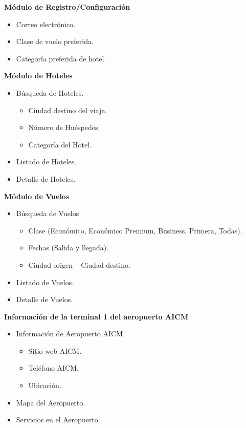 \textbf{Módulo de Registro/Configuración}

\begin{itemize}
	\item Correo electrónico.
	\item Clase de vuelo preferida.
	\item Categoría preferida de hotel. 
\end{itemize}

\textbf{Módulo de Hoteles}

\begin{itemize}
	\item Búsqueda de Hoteles.
	\begin{itemize}
		\item Ciudad destino del viaje.
		\item Número de Huéspedes.
		\item Categoría del Hotel.
	\end{itemize}
	\item Listado de Hoteles.
	\item Detalle de Hoteles.
\end{itemize}

\textbf{Módulo de Vuelos}
 
\begin{itemize}
	\item Búsqueda de Vuelos
	\begin{itemize}
		\item Clase (Económico, Económico Premium, Business, Primera, Todas).
		\item Fechas (Salida y llegada).
		\item Ciudad origen – Ciudad destino.
	\end{itemize}
	\item Listado de Vuelos.
	\item Detalle de Vuelos.
\end{itemize}

\textbf{Información de la terminal 1 del aeropuerto AICM}

\begin{itemize}
	\item Información de Aeropuerto AICM
	\begin{itemize}
		 \item Sitio web AICM.
		\item Teléfono AICM.
		\item Ubicación.
	\end{itemize}
	\item Mapa del Aeropuerto.
	\item	Servicios en el Aeropuerto.
\end{itemize}

